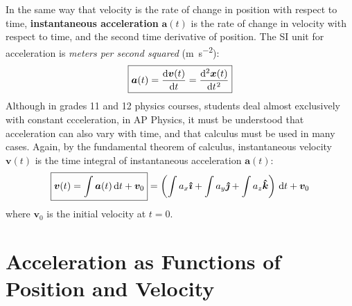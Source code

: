\documentclass{../../oss-handout}
\begin{document}
In the same way that velocity is the rate of change in position with respect
to time, \textbf{instantaneous acceleration} $\bm{a}(t)$ is the rate of change
in velocity with respect to time, and the second time derivative of position.
The SI unit for acceleration is \emph{meters per second squared}
(\si{\metre\per\second\squared}):
\begin{equation}
  \boxed{\bm{a}(t)= \diff{\bm{v}(t)}t=\diff[2]{\bm{x}(t)}t}
\end{equation}
Although in grades 11 and 12 physics courses, students deal almost exclusively
with constant ccceleration, in AP Physics, it must be understood that
acceleration can also vary with time, and that calculus must be used in many
cases.
Again, by the fundamental theorem of calculus, instantaneous velocity
$\bm{v}(t)$ is the time integral of instantaneous acceleration $\bm{a}(t)$:
\begin{equation}
  \boxed{\bm{v}(t)=\int\bm{a}(t)\dl t+\bm{v}_0} =
    \left(\int a_x\bm{\hat{\imath}} +
    \int a_y\bm{\hat{\jmath}} +
    \int a_z\bm{\hat{k}}\right)\dl t +\bm{v}_0
\end{equation}
where $\bm{v}_0$ is the initial velocity at $t=0$.

\section{Acceleration as Functions of Position and Velocity}
\end{document}
